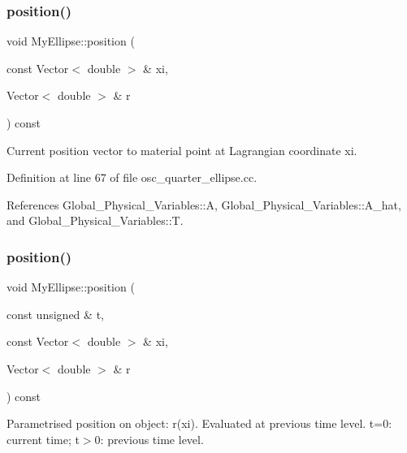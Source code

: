 \subsubsection{\texorpdfstring{position()}{position()}\hspace{0.1cm}{\footnotesize\ttfamily [1/2]}}
{\footnotesize\ttfamily void My\+Ellipse\+::position (\begin{DoxyParamCaption}\item[{const Vector$<$ double $>$ \&}]{xi,  }\item[{Vector$<$ double $>$ \&}]{r }\end{DoxyParamCaption}) const\hspace{0.3cm}{\ttfamily [inline]}}



Current position vector to material point at Lagrangian coordinate xi. 



Definition at line 67 of file osc\+\_\+quarter\+\_\+ellipse.\+cc.



References Global\+\_\+\+Physical\+\_\+\+Variables\+::A, Global\+\_\+\+Physical\+\_\+\+Variables\+::\+A\+\_\+hat, and Global\+\_\+\+Physical\+\_\+\+Variables\+::T.

\mbox{\label{classMyEllipse_a93f75bf33969037e35d779738a8493f5}} 
\subsubsection{\texorpdfstring{position()}{position()}\hspace{0.1cm}{\footnotesize\ttfamily [2/2]}}
{\footnotesize\ttfamily void My\+Ellipse\+::position (\begin{DoxyParamCaption}\item[{const unsigned \&}]{t,  }\item[{const Vector$<$ double $>$ \&}]{xi,  }\item[{Vector$<$ double $>$ \&}]{r }\end{DoxyParamCaption}) const\hspace{0.3cm}{\ttfamily [inline]}}



Parametrised position on object\+: r(xi). Evaluated at previous time level. t=0\+: current time; t$>$0\+: previous time level. 



